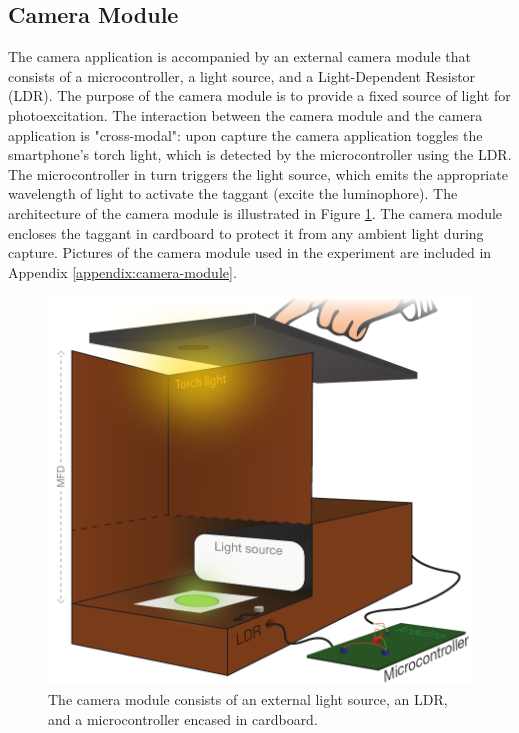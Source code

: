 \documentclass[thesis.tex]{subfiles}
\begin{document}
\subsection{Camera Module}
\label{chapter:camera-module}

The camera application is accompanied by an external camera module that consists of a microcontroller, a light source, and a Light-Dependent Resistor (LDR). The purpose of the camera module is to provide a fixed source of light for photoexcitation. The interaction between the camera module and the camera application is "cross-modal": upon capture the camera application toggles the smartphone's torch light, which is detected by the microcontroller using the LDR. The microcontroller in turn triggers the light source, which emits the appropriate wavelength of light to activate the taggant (excite the luminophore). The architecture of the camera module is illustrated in Figure \ref{figure:camera_module}. The camera module encloses the taggant in cardboard to protect it from any ambient light during capture. Pictures of the camera module used in the experiment are included in Appendix \ref{appendix:camera-module}.

\begin{figure}[h]
\centering \includegraphics[width=13cm]{images/design_implementation/camera_module.pdf}
\caption{The camera module consists of an external light source, an LDR, and a microcontroller encased in cardboard. \label{figure:camera_module}}
\end{figure}
\end{document}
